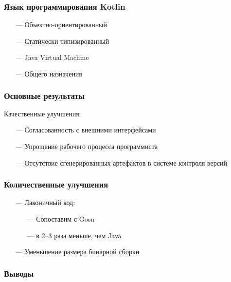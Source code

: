 \documentclass[14pt]{beamer}
\begin{document}
\begin{frame}\frametitle{Язык программирования Kotlin}
    \begin{itemize}
        \item[---] Объектно-ориентированный
        \item[---] Статически типизированный
        \item[---] Java Virtual Machine
        \item[---] Общего назначения
    \end{itemize}
\end{frame}



\begin{frame}\frametitle{Основные результаты}
    Качественные улучшения:
    \begin{itemize}
        \item[---] Согласованность с внешними интерфейсами
        \item[---] Упрощение рабочего процесса программиста
        \item[---] Отсутствие сгенерированных артефактов в системе контроля версий
    \end{itemize}
\end{frame}

\begin{frame}\frametitle{Количественные улучшения}
    \begin{itemize}
        \item[---] Лаконичный код:
            \begin{itemize}
                \item[---] Сопоставим с Gosu
                \item[---] в 2--3 раза меньше, чем Java
            \end{itemize}
        \item[---] Уменьшение размера бинарной сборки
    \end{itemize}
\end{frame}

\begin{frame}\frametitle{Выводы}
\end{frame}
\end{document}
